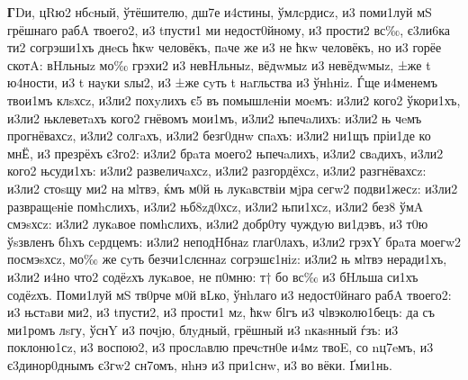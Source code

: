 \textbf{Г}Dи, цRю2 нбcный, ўтёшителю, дш7е и4стины, ўмлcрдисz, и3 поми1луй мS
грёшнаго рабA твоего2, и3 tпусти1 ми недост0йному, и3 прости2 вс‰,
є3ли6ка ти2 согрэши1хъ днeсь ћкw человёкъ, пaче же и3 не ћкw человёкъ,
но и3 горёе скотA: вHльныz мо‰ грэхи2 и3 невHльныz, вёдwмыz и3
невёдwмыz, ±же t ю4ности, и3 t наyки ѕлы2, и3 ±же сyть t нaгльства и3
ўнhніz. Ѓще и4менемъ твои1мъ клsхсz, и3ли2 похyлихъ є5 въ помышлeніи
моeмъ: и3ли2 кого2 ўкори1хъ, и3ли2 њклеветaхъ кого2 гнёвомъ мои1мъ,
и3ли2 њпечaлихъ: и3ли2 њ чeмъ прогнёвахсz, и3ли2 солгaхъ, и3ли2 безг0днw
спaхъ: и3ли2 ни1щъ пріи1де ко мнЁ, и3 презрёхъ є3го2: и3ли2 брaта моего2
њпечaлихъ, и3ли2 свaдихъ, и3ли2 кого2 њсуди1хъ: и3ли2 развеличaхсz,
и3ли2 разгордёхсz, и3ли2 разгнёвахсz: и3ли2 стоsщу ми2 на мlтвэ, ќмъ м0й
њ лукaвствіи мjра сегw2 подви1жесz: и3ли2 развращeніе помhслихъ, и3ли2
њб8zд0хсz, и3ли2 њпи1хсz, и3ли2 без8 ўмA смэsхсz: и3ли2 лукaвое
помhслихъ, и3ли2 добр0ту чуждyю ви1дэвъ, и3 т0ю ўsзвленъ бhхъ сeрдцемъ:
и3ли2 неподHбнаz глаг0лахъ, и3ли2 грэхY брaта моегw2 посмэsхсz, мо‰ же
сyть безчи1слєннаz согрэшє1ніz: и3ли2 њ мlтвэ неради1хъ, и3ли2 и4но что2
содёzхъ лукaвое, не п0мню: т† бо вс‰ и3 бHльша си1хъ содёzхъ. Поми1луй
мS тв0рче м0й вLко, ўнhлаго и3 недост0йнаго рабA твоего2: и3 њстaви ми2,
и3 tпусти2, и3 прости1 мz, ћкw бlгъ и3 чlвэколю1бецъ: да съ ми1ромъ
лsгу, ўснY и3 почjю, блyдный, грёшный и3 nкаsнный ѓзъ: и3 поклоню1сz, и3
воспою2, и3 прослaвлю пречcтн0е и4мz твоE, со nц7eмъ, и3 є3динор0днымъ
є3гw2 сн7омъ, нhнэ и3 при1снw, и3 во вёки. Ґми1нь.


